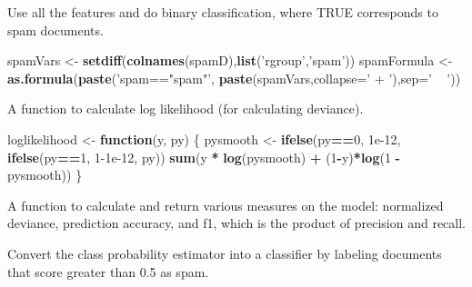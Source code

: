 \documentclass[]{article}
\newenvironment{Shaded}{\begin{snugshade}}{\end{snugshade}}
\newcommand{\ControlFlowTok}[1]{\textcolor[rgb]{0.13,0.29,0.53}{\textbf{#1}}}
\newcommand{\DataTypeTok}[1]{\textcolor[rgb]{0.13,0.29,0.53}{#1}}
\newcommand{\DecValTok}[1]{\textcolor[rgb]{0.00,0.00,0.81}{#1}}
\newcommand{\FloatTok}[1]{\textcolor[rgb]{0.00,0.00,0.81}{#1}}
\newcommand{\KeywordTok}[1]{\textcolor[rgb]{0.13,0.29,0.53}{\textbf{#1}}}
\newcommand{\NormalTok}[1]{#1}
\newcommand{\OperatorTok}[1]{\textcolor[rgb]{0.81,0.36,0.00}{\textbf{#1}}}
\newcommand{\StringTok}[1]{\textcolor[rgb]{0.31,0.60,0.02}{#1}}
\begin{document}
Use all the features and do binary classification, where TRUE
corresponds to spam documents.

\begin{Shaded}
\begin{Highlighting}[]
\NormalTok{spamVars <-}\StringTok{ }\KeywordTok{setdiff}\NormalTok{(}\KeywordTok{colnames}\NormalTok{(spamD),}\KeywordTok{list}\NormalTok{(}\StringTok{'rgroup'}\NormalTok{,}\StringTok{'spam'}\NormalTok{))}
\NormalTok{spamFormula <-}\StringTok{ }\KeywordTok{as.formula}\NormalTok{(}\KeywordTok{paste}\NormalTok{(}\StringTok{'spam=="spam"'}\NormalTok{,}
\KeywordTok{paste}\NormalTok{(spamVars,}\DataTypeTok{collapse=}\StringTok{' + '}\NormalTok{),}\DataTypeTok{sep=}\StringTok{' ~ '}\NormalTok{))}
\end{Highlighting}
\end{Shaded}

A function to calculate log likelihood (for calculating deviance).

\begin{Shaded}
\begin{Highlighting}[]
\NormalTok{loglikelihood <-}\StringTok{ }\ControlFlowTok{function}\NormalTok{(y, py) \{ }
\NormalTok{  pysmooth <-}\StringTok{ }\KeywordTok{ifelse}\NormalTok{(py}\OperatorTok{==}\DecValTok{0}\NormalTok{, }\FloatTok{1e-12}\NormalTok{,}
              \KeywordTok{ifelse}\NormalTok{(py}\OperatorTok{==}\DecValTok{1}\NormalTok{, }\DecValTok{1}\FloatTok{-1e-12}\NormalTok{, py))}
  \KeywordTok{sum}\NormalTok{(y }\OperatorTok{*}\StringTok{ }\KeywordTok{log}\NormalTok{(pysmooth) }\OperatorTok{+}\StringTok{ }\NormalTok{(}\DecValTok{1}\OperatorTok{-}\NormalTok{y)}\OperatorTok{*}\KeywordTok{log}\NormalTok{(}\DecValTok{1} \OperatorTok{-}\StringTok{ }\NormalTok{pysmooth))}
\NormalTok{\}}
\end{Highlighting}
\end{Shaded}

A function to calculate and return various measures on the model:
normalized deviance, prediction accuracy, and f1, which is the product
of precision and recall.

Convert the class probability estimator into a classifier by labeling
documents that score greater than 0.5 as spam.
\end{document}
